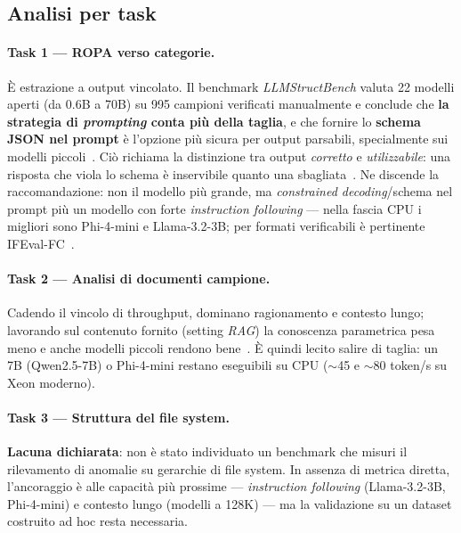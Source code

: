 \subsection{Analisi per task}
\label{sub:slm-task}

\paragraph{Task 1 --- ROPA verso categorie.} È estrazione a output vincolato. Il benchmark \textit{LLMStructBench} valuta 22 modelli aperti (da 0.6B a 70B) su 995 campioni verificati manualmente e conclude che \textbf{la strategia di \textit{prompting} conta più della taglia}, e che fornire lo \textbf{schema JSON nel prompt} è l'opzione più sicura per output parsabili, specialmente sui modelli piccoli~\cite{tenckhoff2026llmstructbench}. Ciò richiama la distinzione tra output \textit{corretto} e \textit{utilizzabile}: una risposta che viola lo schema è inservibile quanto una sbagliata~\cite{structuredreliability2026}. Ne discende la raccomandazione: non il modello più grande, ma \textit{constrained decoding}/schema nel prompt più un modello con forte \textit{instruction following} --- nella fascia CPU i migliori sono Phi-4-mini e Llama-3.2-3B; per formati verificabili è pertinente IFEval-FC~\cite{skripko2025ifevalfc}.

\paragraph{Task 2 --- Analisi di documenti campione.} Cadendo il vincolo di throughput, dominano ragionamento e contesto lungo; lavorando sul contenuto fornito (setting \textit{RAG}) la conoscenza parametrica pesa meno e anche modelli piccoli rendono bene~\cite{malakhov2026cpullm}. È quindi lecito salire di taglia: un 7B (Qwen2.5-7B) o Phi-4-mini restano eseguibili su CPU ($\sim$45 e $\sim$80 token/s su Xeon moderno).

\paragraph{Task 3 --- Struttura del file system.} \textbf{Lacuna dichiarata}: non è stato individuato un benchmark che misuri il rilevamento di anomalie su gerarchie di file system. In assenza di metrica diretta, l'ancoraggio è alle capacità più prossime --- \textit{instruction following} (Llama-3.2-3B, Phi-4-mini) e contesto lungo (modelli a 128K) --- ma la validazione su un dataset costruito ad hoc resta necessaria.

